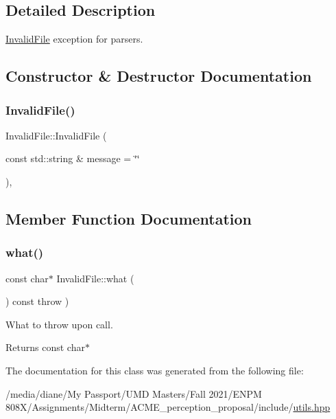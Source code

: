 \subsection{Detailed Description}
\hyperlink{class_invalid_file}{Invalid\+File} exception for parsers. 

\subsection{Constructor \& Destructor Documentation}
\mbox{\label{class_invalid_file_ae8e9774922e4413b547b927678450403}} 
\subsubsection{\texorpdfstring{Invalid\+File()}{InvalidFile()}}
{\footnotesize\ttfamily Invalid\+File\+::\+Invalid\+File (\begin{DoxyParamCaption}\item[{const std\+::string \&}]{message = {\ttfamily \char`\"{}\char`\"{}} }\end{DoxyParamCaption})\hspace{0.3cm}{\ttfamily [inline]}, {\ttfamily [explicit]}}



\subsection{Member Function Documentation}
\mbox{\label{class_invalid_file_a1652de4e9e153ed2bf68847b60fa97f4}} 
\subsubsection{\texorpdfstring{what()}{what()}}
{\footnotesize\ttfamily const char$\ast$ Invalid\+File\+::what (\begin{DoxyParamCaption}{ }\end{DoxyParamCaption}) const throw  ) \hspace{0.3cm}{\ttfamily [inline]}}



What to throw upon call. 

\begin{DoxyReturn}{Returns}
const char$\ast$ 
\end{DoxyReturn}


The documentation for this class was generated from the following file\+:\begin{DoxyCompactItemize}
\item 
/media/diane/\+My Passport/\+U\+M\+D Masters/\+Fall 2021/\+E\+N\+P\+M 808\+X/\+Assignments/\+Midterm/\+A\+C\+M\+E\+\_\+perception\+\_\+proposal/include/\hyperlink{utils_8hpp}{utils.\+hpp}\end{DoxyCompactItemize}
